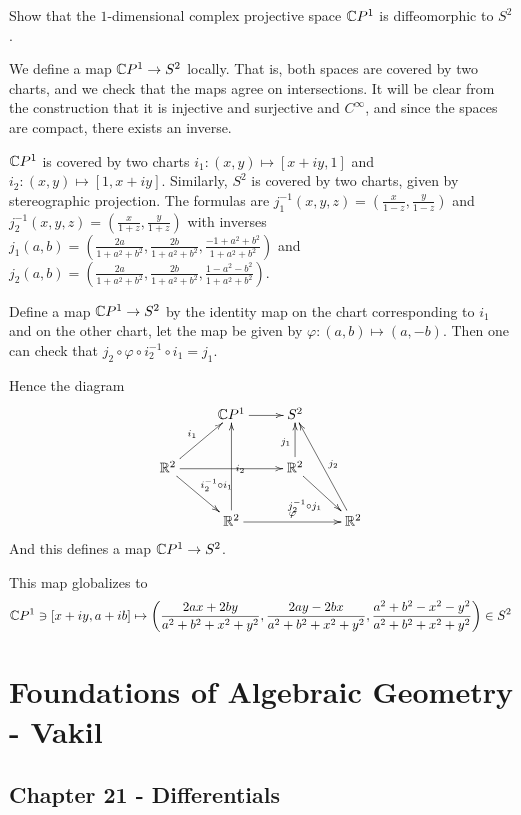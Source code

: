 \documentclass[11pt, english]{article}
\begin{document}
\begin{exc}[1.3]

Show that the $1$-dimensional complex projective space $\mathbb{C} P^1$ is diffeomorphic to $S^2$.
\end{exc}

\begin{sol}
We define a map $\mathbb{C} P^1 \to S^2$ locally. That is, both spaces are covered by two charts, and we check that the maps agree on intersections. It will be clear from the construction that it is injective and surjective and $C^\infty$, and since the spaces are compact, there exists an inverse.

$\mathbb{C} P ^1$ is covered by two charts $i_1:(x,y) \mapsto [x+iy,1]$ and $i_2:(x,y) \mapsto [1,x+iy]$. Similarly, $S^2$ is covered by two charts, given by stereographic projection. The formulas are $j_1^{-1} (x,y,z) = \left (\frac{x}{1-z}, \frac{y}{1-z}\right)$ and $j_2^{-1}(x,y,z) = \left( \frac{x}{1+z},\frac{y}{1+z} \right)$ with inverses $j_1(a,b) = \left( \frac{2a}{1+a^2+b^2}, \frac{2b}{1+a^2+b^2}, \frac{-1+a^2+b^2}{1+a^2+b^2}\right)$ and $j_2(a,b) = \left( \frac{2a}{1+a^2+b^2}, \frac{2b}{1+a^2+b^2}, \frac{1-a^2-b^2}{1+a^2+b^2} \right)$.

Define a map $\mathbb{C} P^1 \to S^2$ by the identity map on the chart corresponding to $i_1$ and on the other chart, let the map be given by $\varphi: (a,b) \mapsto (a,-b)$. Then one can check that $ j_2 \circ \varphi \circ i_2^{-1} \circ i_1 = j_1$.

Hence the diagram
\[
\xymatrix{
 & \C P^1 \ar[r] & S^2 & \\
\R^2 \ar[ur]^{i_1} \ar[dr]^{i_2^{-1} \circ i_1} \ar[rr] & & \R^2 \ar[dr]_{j_2^{-1} \circ j_ 1} \ar[u]^{j_1} & \\
& \R^2 \ar[uu]_{i_2} \ar[rr]^\varphi & & \R^2 \ar[uul]_{j_2} 
}
\]
And this defines a map $\mathbb{C} P^1 \to S^2$. 

This map globalizes to
\[
\mathbb{C} P ^1 \ni [x+iy, a+ib] \mapsto \left( \frac{2ax+2by}{a^2+b^2+x^2+y^2}, \frac{2ay-2bx}{a^2+b^2+x^2+y^2}, \frac{a^2+b^2-x^2-y^2}{a^2+b^2+x^2+y^2}\right) \in S^2
\]
\end{sol}


\section{Foundations of Algebraic Geometry - Vakil}

\subsection{Chapter 21 - Differentials}
\end{document}
